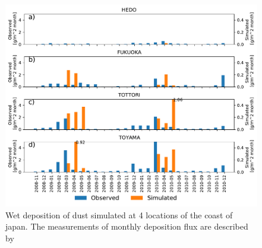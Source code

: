 \begin{figure}[hptb]
    \centering
    \includegraphics[width=\textwidth]{texfiles/figs/monthly_accumulated_wet_depostion_japan.pdf}
    \caption{Wet deposition of dust simulated at 4 locations of the coast of japan. The measurements of monthly deposition flux are described by \textcite{osada2014wet}}
    \label{fig:model_eval_wet_deposition}
\end{figure}

